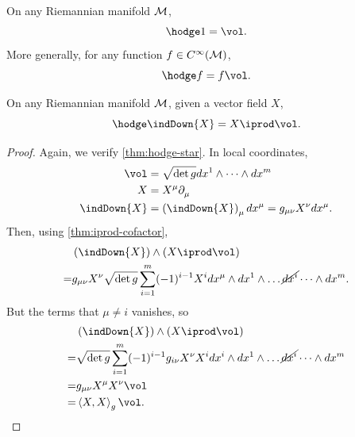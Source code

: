 \documentclass[../main.tex]{subfiles}
\begin{document}
    \begin{theorem}\label{thm:hodge-dual-constant}
        On any Riemannian manifold \(\manifold[M]\),
        \[
        \hodge 1=\vol.
        \]
        More generally, for any function \(f \in C^\infty(\manifold[M])\),
        \[
        \hodge f=f\vol.
        \]
    \end{theorem}
    \begin{theorem}\label{thm:hodge-dual-vector-field}
        On any Riemannian manifold \(\manifold[M]\), given a vector field \(X\), 
        \[
        \hodge \indDown{X}=X\iprod \vol.
        \]
    \end{theorem}
    \begin{proof}
        Again, we verify \cref{thm:hodge-star}. In local coordinates, 
        \[
        \begin{aligned}
            \vol &= \sqrt{\det g}dx^1\wedge\dots\wedge dx^m\\
            X &= X^\mu\tfld{\mu}\\
            \indDown{X}&=\left(\indDown{X}\right)_\mu dx^\mu=g_{\mu\nu}X^\nu dx^\mu.
        \end{aligned}
        \]
        Then, using \cref{thm:iprod-cofactor}, 
        \[
        \begin{aligned}
            &\left(\indDown{X}\right)\wedge \left(X\iprod \vol\right)\\
            =&g_{\mu\nu}X^\nu\sqrt{\det g}\sum_{i=1}^{m} (-1)^{i-1}
            X^i dx^\mu\wedge dx^1\wedge\dots\cancel{dx^i}\dots\wedge dx^m.
        \end{aligned}
        \]
        But the terms that \(\mu \neq i\) vanishes, so 
        \[
        \begin{aligned}
            &\left(\indDown{X}\right)\wedge \left(X\iprod \vol\right)\\
            =&\sqrt{\det g}\sum_{i=1}^{m} (-1)^{i-1}g_{i\nu}X^\nu
            X^i dx^i\wedge dx^1\wedge\dots\cancel{dx^i}\dots\wedge dx^m\\
            =&g_{\mu\nu}X^\mu X^\nu \vol\\
            =&\left<X, X\right>_g\vol.
        \end{aligned}
        \]
    \end{proof}
\end{document}
